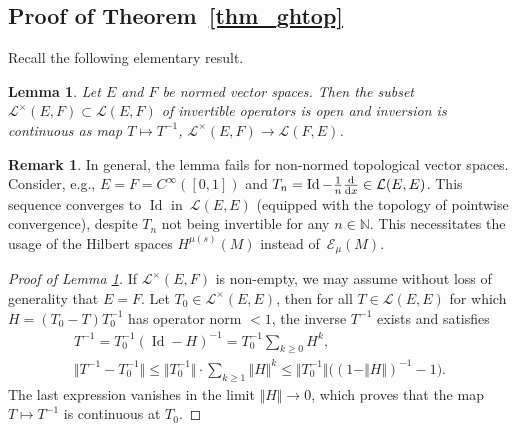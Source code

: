 \documentclass[10pt,a4paper]{amsart}
\numberwithin{equation}{section}
\newtheorem{Lemma}[Theorem]{Lemma}
\theoremstyle{definition}
\newtheorem{Remark}[Theorem]{Remark}
\newcommand{\1}{{\bf 1}}
\begin{document}
\subsection{Proof of Theorem~\ref{thm_ghtop}}
 Recall the following elementary result.

\begin{Lemma}\label{inversion} Let $E$ and $F$ be normed vector spaces. Then the subset $\mathcal L^\times(E,F) \subset \mathcal L(E,F)$ of invertible operators is open and inversion is continuous as map
$
T\mapsto T^{-1}$, $ \mathcal L^\times(E,F)\rightarrow \mathcal L(F,E)$.
\end{Lemma}

\begin{Remark}
In general, the lemma fails for non-normed topological vector spaces. Consider, e.g., $E=F=C^\infty([0,1])$ and $T_n = \operatorname{Id} - \frac 1n \frac {\rm d}{{\rm d}x}\in \mathcal L(E,E)$. This sequence converges to $\operatorname{Id}$ in~$\mathcal L(E,E)$ (equipped with the topology of pointwise convergence), despite $T_n$ not being invertible for any $n\in \mathbb N$. This necessitates the usage of the Hilbert spaces $H^{\mu(s)}(M)$ instead of~$\mathcal E_\mu(M)$.
\end{Remark}

\begin{proof}[Proof of Lemma \ref{inversion}] If $\mathcal L^\times (E,F)$ is non-empty, we may assume without loss of generality that $E=F$. Let $T_0\in \mathcal L^\times (E,E)$, then for all $T\in \mathcal L(E,E)$ for which $H= (T_0-T)T_0^{-1}$ has operator norm $<1$, the inverse $T^{-1}$ exists and satisfies
\begin{gather*}
T^{-1} =T_0^{-1}(\operatorname{Id} - H )^{-1} = T_0^{-1} \sum_{k\ge 0} H^k,\\
\big\Vert T^{-1} -T_0^{-1} \big\Vert \le \bigl\Vert T_0^{-1} \bigr\Vert \cdot \sum_{k\ge 1}  \Vert H \Vert^k \le \big\Vert T_0^{-1} \big\Vert \bigl((1-\Vert H \Vert)^{-1} - 1\bigr).
\end{gather*}
The last expression vanishes in the limit $\Vert H \Vert\rightarrow 0$, which proves that the map $T\mapsto T^{-1}$ is continuous at $T_0$.
\end{proof}
\end{document}
